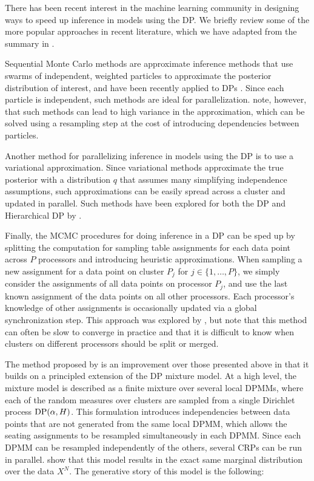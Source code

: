 There has been recent interest in the machine learning community in
designing ways to speed up inference in models using the DP. We
briefly review some of the more popular approaches in recent
literature, which we have adapted from the summary in
\cite{williamson2013}.

Sequential Monte Carlo methods are approximate inference methods that
use swarms of independent, weighted particles to approximate the
posterior distribution of interest, and have been recently applied to
DPs \cite{fearnhead2004, ulker2010, rodriguez2011, ahmed2011}. Since
each particle is independent, such methods are ideal for
parallelization. \cite{williamson2013} note, however, that such
methods can lead to high variance in the approximation, which can be
solved using a resampling step at the cost of introducing dependencies
between particles.

Another method for parallelizing inference in models using the DP is
to use a variational approximation. Since variational methods
approximate the true posterior with a distribution $q$ that assumes
many simplifying independence assumptions, such approximations can be
easily spread across a cluster and updated in parallel. Such methods
have been explored for both the DP and Hierarchical DP by
\cite{blei2004, kurihara2007, teh2008, wang2011}.

Finally, the MCMC procedures for doing inference in a DP can be sped
up by splitting the computation for sampling table assignments for
each data point across $P$ processors and introducing heuristic
approximations. When sampling a new assignment for a data point on
cluster $P_j$ for $j \in \{1, \ldots, P\}$, we simply consider the
assignments of all data points on processor $P_j$, and use the last
known assignment of the data points on all other processors. Each
processor's knowledge of other assignments is occasionally updated via
a global synchronization step. This approach was explored by
\cite{asuncion2008}, but \cite{williamson2013} note that this method
can often be slow to converge in practice and that it is difficult to
know when clusters on different processors should be split or merged.

The method proposed by \cite{williamson2013} is an improvement over
those presented above in that it builds on a principled extension of
the DP mixture model. At a high level, the mixture model is described
as a finite mixture over several local DPMMs, where each of the random
measures over clusters are sampled from a single Dirichlet process
$\mathrm{DP}(\alpha, H)$. This formulation introduces independencies between
data points that are not generated from the same local DPMM, which
allows the seating assignments to be resampled simultaneously in each
DPMM. Since each DPMM can be resampled independently of the others,
several CRPs can be run in parallel. \cite{williamson2013} show that
this model results in the exact same marginal distribution over the
data $X^N$. The generative story of this model is the following:

